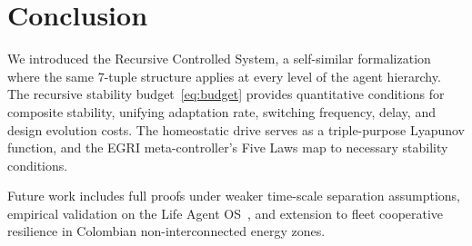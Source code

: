 \documentclass[conference]{IEEEtran}
\begin{document}
\section{Conclusion}
\label{sec:conclusion}

We introduced the Recursive Controlled System, a self-similar formalization
where the same 7-tuple structure applies at every level of the agent
hierarchy.  The recursive stability budget~\eqref{eq:budget} provides
quantitative conditions for composite stability, unifying adaptation rate,
switching frequency, delay, and design evolution costs.  The homeostatic
drive serves as a triple-purpose Lyapunov function, and the EGRI meta-controller's
Five Laws map to necessary stability conditions.

Future work includes full proofs under weaker time-scale separation
assumptions, empirical validation on the Life Agent OS~\cite{eslami2026control},
and extension to fleet cooperative resilience in Colombian non-interconnected
energy zones.



\end{document}
